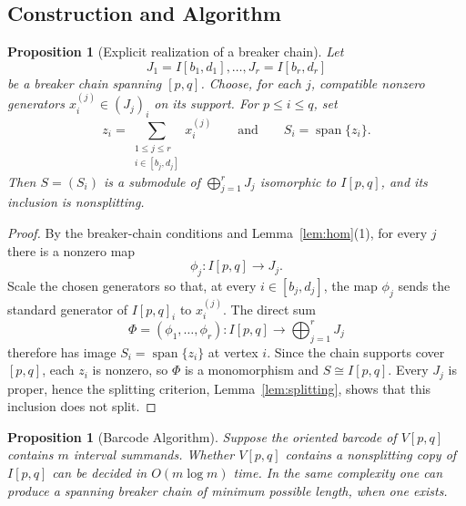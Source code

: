 \documentclass[11pt]{amsart}
\numberwithin{equation}{section}
\newtheorem{proposition}[theorem]{Proposition}
\theoremstyle{definition}
\begin{document}
\subsection{Construction and Algorithm}
\begin{proposition}[Explicit realization of a breaker chain]\label{prop:explicit-chain}
Let
\[
J_1=I[b_1,d_1],\dots,J_r=I[b_r,d_r]
\]
be a breaker chain spanning $[p,q]$.  Choose, for each $j$, compatible
nonzero generators $x_i^{(j)}\in(J_j)_i$ on its support.  For
$p\le i\le q$, set
\[
z_i=\sum_{\substack{1\le j\le r\\ i\in[b_j,d_j]}}x_i^{(j)}
\qquad\text{and}\qquad
S_i=\operatorname{span}\{z_i\}.
\]
Then $S=(S_i)$ is a submodule of $\bigoplus_{j=1}^rJ_j$ isomorphic to
$I[p,q]$, and its inclusion is nonsplitting.
\end{proposition}

\begin{proof}
By the breaker-chain conditions and Lemma~\ref{lem:hom}(1), for every $j$
there is a nonzero map
\[
\phi_j:I[p,q]\longrightarrow J_j.
\]
Scale the chosen generators so that, at every $i\in[b_j,d_j]$, the map
$\phi_j$ sends the standard generator of $I[p,q]_i$ to $x_i^{(j)}$.  The
direct sum
\[
\Phi=(\phi_1,\dots,\phi_r):I[p,q]\longrightarrow\bigoplus_{j=1}^rJ_j
\]
therefore has image $S_i=\operatorname{span}\{z_i\}$ at vertex $i$.  Since
the chain supports cover $[p,q]$, each $z_i$ is nonzero, so $\Phi$ is a
monomorphism and $S\cong I[p,q]$.  Every $J_j$ is proper, hence the splitting
criterion, Lemma~\ref{lem:splitting}, shows that this inclusion does not
split.
\end{proof}


\begin{proposition}[Barcode Algorithm]\label{prop:algorithm}
Suppose the oriented barcode of $V[p,q]$ contains $m$ interval summands.
Whether $V[p,q]$ contains a nonsplitting copy of $I[p,q]$ can be decided in
$O(m\log m)$ time.  In the same complexity one can produce a spanning breaker
chain of minimum possible length, when one exists.
\end{proposition}
\end{document}
